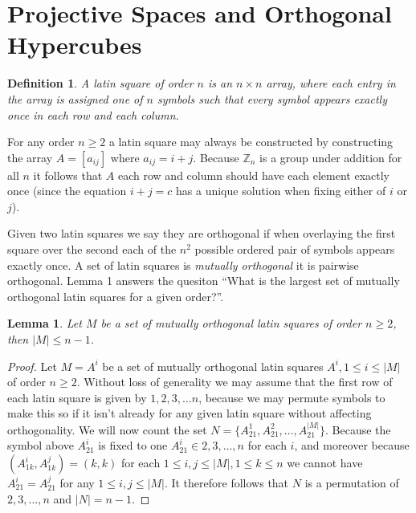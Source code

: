 \documentclass{article}
\newtheorem{lemma}{Lemma}
\newtheorem{definition}{Definition}
\begin{document}
    \section{Projective Spaces and Orthogonal Hypercubes}
    

    \begin{definition}
        A latin square of order \(n\) is an \(n \times n\) array, where each entry in the array is assigned one of \(n\) symbols such that every symbol appears exactly once in each row and each column.
    \end{definition}

    For any order \(n \geq 2\) a latin square may always be constructed by constructing the array \(A = [a_{ij}]\) where \(a_{ij} = i + j\). Because \(\mathbb{Z}_n\) is a group under addition for all \(n\) it follows that \(A\) each row and column should have each element exactly once (since the equation \(i + j = c\) has a unique solution when fixing either of \(i\) or \(j\)).

    Given two latin squares we say they are orthogonal if when overlaying the first square over the second each of the \(n^2\) possible ordered pair of symbols appears exactly once.
    A set of latin squares is \textit{mutually orthogonal} it is pairwise orthogonal. Lemma 1 answers the quesiton ``What is the largest set of mutually orthogonal latin squares for a given order?''.

    \begin{lemma}
        Let \(M\) be a set of mutually orthogonal latin squares of order \(n \geq 2\), then \(|M| \leq n - 1\).
    \end{lemma}
    \begin{proof}
        Let \(M = {A^i}\) be a set of mutually orthogonal latin squares \(A^i, 1 \leq i \leq |M|\) of order \(n \geq 2\). Without loss of generality we may assume that the first row of each latin square is given by \(1, 2, 3, \ldots n\), because we may permute symbols to make this so if it isn't already for any given latin square without affecting orthogonality.
        We will now count the set \(N = \{A^1_{21}, A^2_{21}, \ldots, A^{|M|}_{21}\}\). Because the symbol above \(A^i_{21}\) is fixed to one \(A^i_{21} \in {2, 3, \ldots, n}\) for each \(i\), and moreover because \((A^i_{1k}, A^j_{1k}) = (k, k)\) for each \(1 \leq i, j \leq |M|, 1 \leq k \leq n\) we cannot have \(A^i_{21} = A^j_{21}\) for any \(1 \leq i, j \leq |M|\).
        It therefore follows that \(N\) is a permutation of \({2, 3, \ldots, n}\) and \(|N| = n - 1\).
    \end{proof}
\end{document}

